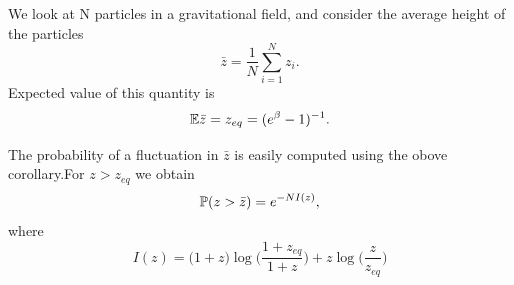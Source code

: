 \documentclass[letterpaper,english,10pt]{article}
\begin{document}
 \begin{exmp}
   We look at N particles in a gravitational field, and consider the average height of the particles 
   \begin{equation}
       \bar{z}= \dfrac{1}{N}\sum_{i=1}^{N}z_i.
    \end{equation}
     Expected value of this quantity  is 
       \begin{equation}
           \E{\bar{z}}= z_{eq}= (e^\beta -1)^{-1}.
           \end{equation}
           
           The probability of a fluctuation in $\bar{z}$ is easily computed using the obove corollary.For $z>z_{eq}$ we obtain 
           \begin{equation}
               \P(z>\bar{z}) = e^{-NI(z)},
           \end{equation}
           where 
           \begin{equation}
               I(z) = \big(1+z\big)\log \big( \dfrac{1+z_{eq}}{1+z}\big) + z\log{\big(\dfrac{z}{z_{eq}}\big)}
           \end{equation}
           
       
   
 \end{exmp}
\end{document}
